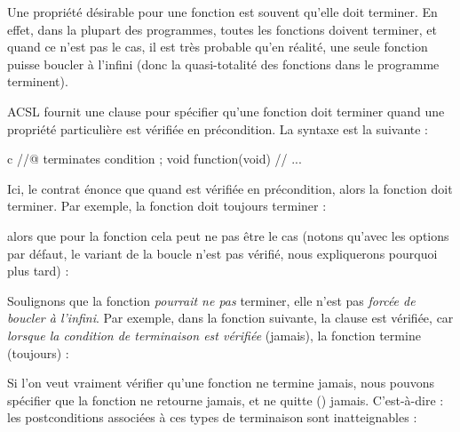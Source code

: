 

Une propriété désirable pour une fonction est souvent qu'elle doit terminer.
En effet, dans la plupart des programmes, toutes les fonctions doivent terminer,
et quand ce n'est pas le cas, il est très probable qu'en réalité, une seule
fonction puisse boucler à l'infini (donc la quasi-totalité des fonctions dans le
programme terminent).




ACSL fournit une clause  pour spécifier qu'une fonction
doit terminer quand une propriété particulière est vérifiée en précondition. La
syntaxe est la suivante :


\begin{CodeBlock}{c}
//@ terminates condition ;
void function(void){
  // ...
}
\end{CodeBlock}


Ici, le contrat énonce que quand  est vérifiée en
précondition, alors la fonction doit terminer. Par exemple, la fonction
 doit toujours terminer :




alors que pour la fonction  cela peut ne pas être le cas
(notons qu'avec les options par défaut, le variant de la boucle n'est pas
vérifié, nous expliquerons pourquoi plus tard) :




Soulignons que la fonction \textit{pourrait ne pas} terminer, elle n'est pas
\textit{forcée de boucler à l'infini}. Par exemple, dans la fonction suivante,
la clause  est vérifiée, car
\textit{lorsque la condition de terminaison est vérifiée} (jamais), la fonction
termine (toujours) :




\begin{Information}
  Si l'on veut vraiment vérifier qu'une fonction ne termine jamais, nous pouvons
  spécifier que la fonction ne retourne jamais, et ne quitte ()
  jamais. C'est-à-dire : les postconditions associées à ces types de terminaison
  sont inatteignables :

\end{Information}


